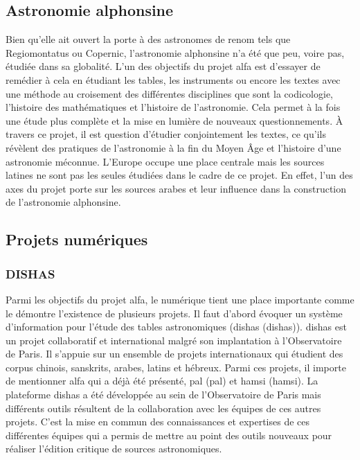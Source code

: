     \subsection{Astronomie alphonsine}
	Bien qu'elle ait ouvert la porte à des astronomes de renom tels que Regiomontatus ou Copernic, l'astronomie alphonsine n'a été que peu, voire pas, étudiée dans sa globalité. L'un des objectifs du projet \acrshort{alfa} est d'essayer de remédier à cela en étudiant les tables, les instruments ou encore les textes avec une méthode au croisement des différentes disciplines que sont la codicologie, l'histoire des mathématiques et l'histoire de l'astronomie. Cela permet à la fois une étude plus complète et la mise en lumière de nouveaux questionnements. À travers ce projet, il est question d'étudier conjointement les textes, ce qu'ils révèlent des pratiques de l'astronomie à la fin du Moyen Âge et l'histoire d'une astronomie méconnue. L'Europe occupe une place centrale mais les sources latines ne sont pas les seules étudiées dans le cadre de ce projet. En effet, l'un des axes du projet porte sur les sources arabes et leur influence dans la construction de l'astronomie alphonsine. 
	
	\subsection{Projets numériques}
	
	\subsubsection{DISHAS}
	Parmi les objectifs du projet \acrshort{alfa}, le numérique tient une place importante comme le démontre l'existence de plusieurs projets. 
	Il faut d'abord évoquer un système d’information pour l’étude des tables astronomiques (\acrlong{dishas} (\acrshort{dishas})). \acrshort{dishas} est un projet collaboratif et international malgré son implantation à l’Observatoire de Paris. Il s’appuie sur un ensemble de projets internationaux qui étudient des corpus chinois, sanskrits, arabes, latins et hébreux. Parmi ces projets, il importe de mentionner \acrshort{alfa} qui a déjà été présenté, \acrshort{pal} (\acrlong{pal}) et \acrshort{hamsi} (\acrlong{hamsi}). La plateforme \acrshort{dishas} a été développée au sein de l’Observatoire de Paris mais différents outils résultent de la collaboration avec les équipes de ces autres projets. C’est la mise en commun des connaissances et expertises de ces différentes équipes qui a permis de mettre au point des outils nouveaux pour réaliser l’édition critique de sources astronomiques. 

